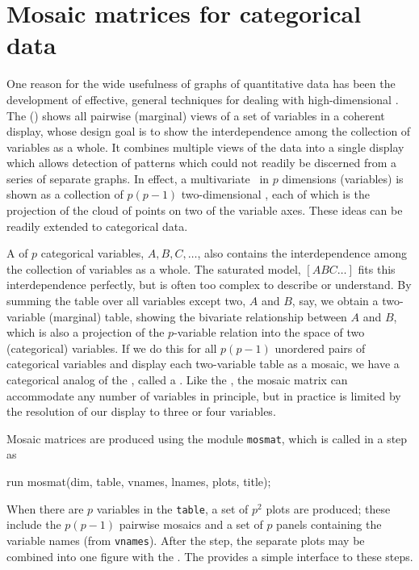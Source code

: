 \section{Mosaic matrices for categorical data}\label{sec:mosmat}

One reason for the wide usefulness of graphs of quantitative data
has been the
development of effective, general techniques for dealing with high-dimensional \Dsets.
The \scatmat{}
()
shows all pairwise (marginal) views of a set of variables
in a coherent display, whose design goal is to show the interdependence
among the collection of variables as a whole.
It combines multiple views of the data
into a single display which allows detection of patterns which could
not readily be discerned from a series of separate graphs.
In effect, a multivariate \Dset\ in $p$ dimensions (variables) is shown as
a collection of $p (p-1)$ two-dimensional \scats{}, each of which is
the projection of the cloud of points on two of the variable axes.
These ideas can be readily extended to categorical data.

A \mway{} \ctab{} of $p$ categorical variables,
$A, B, C,\dots$, also contains the interdependence among the collection
of variables as a whole.  The saturated \loglin{} model, $[A B C\dots]$
fits this interdependence perfectly, but is often too complex to describe
or understand.  By summing the table over all variables except two,
$A$ and $B$, say, we obtain a two-variable (marginal) table, showing the
bivariate relationship between $A$ and $B$, which is also a projection
of the $p$-variable relation into the space of two (categorical) variables.
If we do this for all $p (p-1)$ unordered pairs of categorical variables
and display each two-variable table as a mosaic,  we have a categorical
analog of the \scatmat{}, called a
.
Like the \scatmat{}, the mosaic matrix can accommodate any number of
variables in principle, but in practice is limited by the resolution
of our display to three or four variables.

Mosaic matrices are produced using the \IML{}
module \texttt{mosmat}, which is called in a  step as
\begin{listing}
   run mosmat(dim, table, vnames, lnames, plots, title);
\end{listing}
When there are $p$ variables in the \texttt{table}, a set of $p^2$ plots
are produced;  these include the $p (p-1)$ pairwise mosaics and a set
of $p$ panels containing the variable names (from \texttt{vnames}).
After the \IML{} step, the separate plots may be combined into one figure with the .
The  provides a simple interface to these steps.

